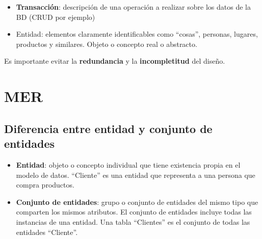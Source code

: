 \documentclass{article}
\begin{document}
\begin{itemize}
    \item \textbf{Transacción}: descripción de una operación a realizar sobre los datos de la BD (CRUD por ejemplo)

    \item Entidad: elementos claramente identificables como “cosas”, personas, lugares, productos y similares. Objeto o concepto real o abstracto.
\end{itemize}

Es importante evitar la \textbf{redundancia} y la \textbf{incompletitud} del diseño.

\newpage

\section{MER}
\subsection{Diferencia entre entidad y conjunto de entidades}
\begin{itemize}
    \item \textbf{Entidad}: objeto o concepto individual que tiene existencia propia en el modelo de datos. “Cliente” es una entidad que representa a una persona que compra productos.

    \item \textbf{Conjunto de entidades}: grupo o conjunto de entidades del mismo tipo que comparten los mismos atributos. El conjunto de entidades incluye todas las instancias de una entidad. Una tabla “Clientes” es el conjunto de todas las entidades “Cliente”.
\end{itemize}
\end{document}

